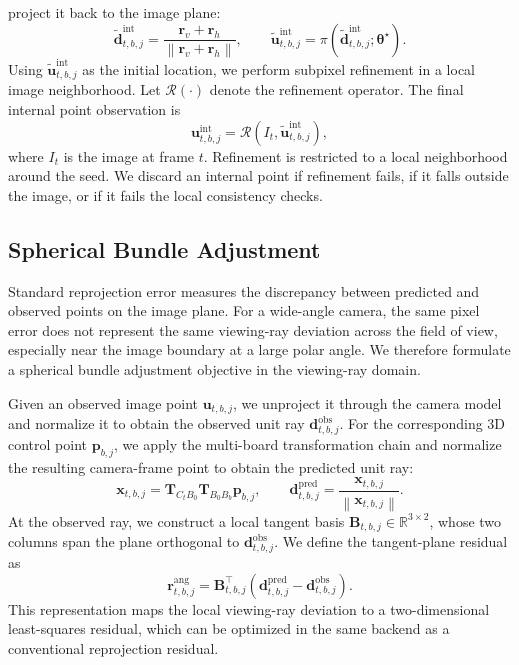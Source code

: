 \documentclass[letterpaper, 10 pt, conference]{ieeeconf}  %
\begin{document}
project it back to the image plane:
\begin{equation}
\tilde{\mathbf{d}}_{t,b,j}^{\mathrm{int}}
=
\frac{\mathbf{r}_{v}+\mathbf{r}_{h}}
{\left\|\mathbf{r}_{v}+\mathbf{r}_{h}\right\|},
\qquad
\tilde{\mathbf{u}}_{t,b,j}^{\mathrm{int}}
=
\pi\!\left(
\tilde{\mathbf{d}}_{t,b,j}^{\mathrm{int}};
\boldsymbol{\theta}^{\star}
\right).
\label{eq:spherical_seed}
\end{equation}
Using $\tilde{\mathbf{u}}_{t,b,j}^{\mathrm{int}}$ as the initial location,
we perform subpixel refinement in a local image neighborhood. Let
$\mathcal{R}(\cdot)$ denote the refinement operator. The final internal point
observation is
\begin{equation}
\mathbf{u}_{t,b,j}^{\mathrm{int}}
=
\mathcal{R}\!\left(
I_t,\tilde{\mathbf{u}}_{t,b,j}^{\mathrm{int}}
\right),
\label{eq:internal_refinement}
\end{equation}
where $I_t$ is the image at frame $t$. Refinement is restricted to a local
neighborhood around the seed. We discard an internal point if refinement
fails, if it falls outside the image, or if it fails the local consistency
checks.

\subsection{Spherical Bundle Adjustment}
\label{subsec:spherical_ba}

Standard reprojection error measures the discrepancy between predicted and
observed points on the image plane. For a wide-angle camera, the same pixel
error does not represent the same viewing-ray deviation across the field of
view, especially near the image boundary at a large polar angle. We therefore
formulate a spherical bundle adjustment objective in the viewing-ray domain.

Given an observed image point $\mathbf{u}_{t,b,j}$, we unproject it through the
camera model and normalize it to obtain the observed unit ray
$\mathbf{d}_{t,b,j}^{\mathrm{obs}}$. For the corresponding 3D control point
$\mathbf{p}_{b,j}$, we apply the multi-board transformation chain and normalize
the resulting camera-frame point to obtain the predicted unit ray:
\begin{equation}
\mathbf{x}_{t,b,j}
=
\mathbf{T}_{C_tB_0}\mathbf{T}_{B_0B_b}\mathbf{p}_{b,j},
\qquad
\mathbf{d}_{t,b,j}^{\mathrm{pred}}
=
\frac{\mathbf{x}_{t,b,j}}{\left\|\mathbf{x}_{t,b,j}\right\|}.
\label{eq:predicted_ray}
\end{equation}
At the observed ray, we construct a local tangent basis
$\mathbf{B}_{t,b,j}\in\mathbb{R}^{3\times2}$, whose two columns span the plane
orthogonal to $\mathbf{d}_{t,b,j}^{\mathrm{obs}}$. We define the tangent-plane
residual as
\begin{equation}
\mathbf{r}_{t,b,j}^{\mathrm{ang}}
=
\mathbf{B}_{t,b,j}^{\top}
\left(
\mathbf{d}_{t,b,j}^{\mathrm{pred}}
-
\mathbf{d}_{t,b,j}^{\mathrm{obs}}
\right).
\label{eq:tangent_residual}
\end{equation}
This representation maps the local viewing-ray deviation to a two-dimensional
least-squares residual, which can be optimized in the same backend as a
conventional reprojection residual.
\end{document}
